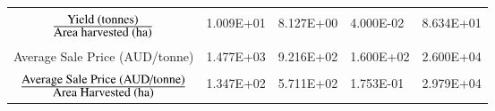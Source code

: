 \documentclass[review,12pt,authoryear]{elsarticle}
\begin{document}
\begin{linenumbers}
\begin{table}[]
\begin{tabular}{@{}cllll@{}}
          \multicolumn{1}{l}{} &  &  &  &  \\
          $\mbox{Yield (tonnes)}\over \mbox{Area harvested (ha)}$ & 1.009E+01 & 8.127E+00 & 4.000E-02 & 8.634E+01 \\
          \multicolumn{1}{l}{} &  &  &  &  \\
          {Average Sale Price (AUD/tonne)} & 1.477E+03 & 9.216E+02 & 1.600E+02 & 2.600E+04 \\
          \multicolumn{1}{l}{} &  &  &  &  \\
          $\mbox{Average Sale Price (AUD/tonne)} \over \mbox{Area Harvested (ha)}$ & 1.347E+02 & 5.711E+02 & 1.753E-01 & 2.979E+04 \\ \bottomrule
          \end{tabular}
  \end{table}


\end{linenumbers}
\end{document}
